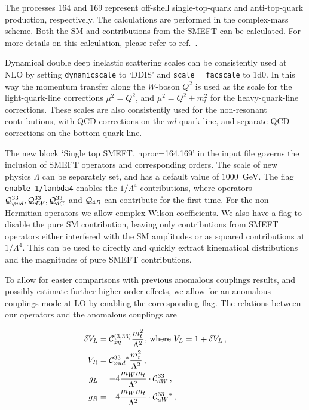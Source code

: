 \label{subsec:offstop}

The processes 164 and 169 represent off-shell single-top-quark and anti-top-quark production, respectively.
The calculations are performed in the complex-mass scheme.
Both the SM and contributions from the SMEFT can be calculated.
For more details on this calculation, please refer to ref.~\cite{Neumann:2019kvk}.

Dynamical double deep inelastic scattering scales can be
consistently used at NLO by setting \texttt{dynamicscale} to `DDIS'
and \texttt{scale}$=$\texttt{facscale} to 1d0. In this way the
momentum transfer along the $W$-boson $Q^2$ is used as the scale for
the light-quark-line corrections $\mu^2=Q^2$, and $\mu^2=Q^2+m_t^2$ for
the heavy-quark-line corrections. These scales are also consistently
used for the non-resonant contributions, with QCD corrections on the
$ud$-quark line, and separate QCD corrections on the bottom-quark
line.

The new block `Single top SMEFT, nproc=164,169' in the input
file governs the inclusion of SMEFT operators and corresponding
orders.  The scale of new physics $\Lambda$ can be separately set, and
has a default value of $1000$~GeV.  The flag \texttt{enable
	1/lambda4} enables the $1/\Lambda^4$ contributions, where operators
$\mathcal{Q}_{\varphi u d }^{33}, \mathcal{Q}_{dW}^{33}, \mathcal{Q}_{dG}^{33}$ and $\mathcal{Q}_{4R}$ can contribute for the first
time.  For the non-Hermitian operators we allow complex Wilson
coefficients.  We also have a flag to disable the pure SM
contribution, leaving only contributions from SMEFT operators
either interfered with the SM amplitudes or as squared
contributions at $1/\Lambda^4$.  This can be used to directly and
quickly extract kinematical distributions and the magnitudes of
pure SMEFT contributions.

To allow for easier comparisons with previous anomalous couplings
results, and possibly estimate further higher order effects, we allow
for an anomalous couplings mode at LO by enabling the corresponding
flag.  The relations between our operators and the anomalous couplings
are

\begin{align*}
	 \delta V_L &= \mathcal{C}_{\varphi q}^{(3,33)} \frac{m_t^2}{\Lambda^2} ,\,\text{where } V_L = 1 + \delta V_L\,,\\
	 V_R &= \mathcal{C}_{\varphi u d }^{33}{}^* \frac{m_t^2}{\Lambda^2}\,, \\
	 g_L &= -4\frac{m_W m_t}{\Lambda^2} \cdot \mathcal{C}_{dW}^{33}\,, \\
	 g_R &= -4 \frac{m_W m_t}{\Lambda^2} \cdot \mathcal{C}_{uW}^{33}{}^*\,,
\end{align*}

